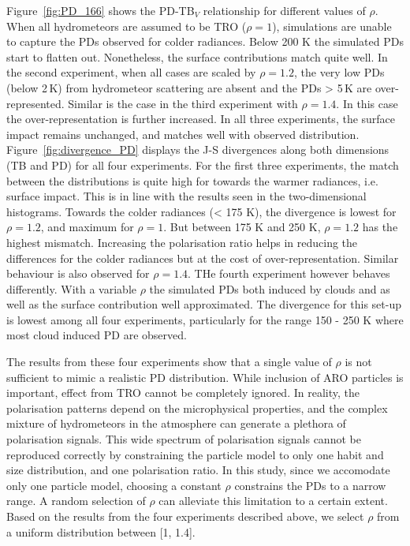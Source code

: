 \documentclass[amt, manuscript]{copernicus}
\begin{document}
Figure~\ref{fig:PD_166} shows the PD-TB$_V$ relationship for different values of $\rho$. When all hydrometeors are assumed to be TRO ($\rho = 1$), simulations are unable to capture the PDs observed for colder radiances. Below 200\,\,K the simulated PDs start to flatten out. Nonetheless, the surface contributions match quite well. In the second experiment, when all cases are scaled by $\rho = 1.2$, the very low PDs (below 2\,K) from hydrometeor scattering are absent and the PDs > 5\,K are over-represented. Similar is the case in the third experiment with $\rho = 1.4$. In this case the over-representation is further increased. In all three experiments, the surface impact remains unchanged, and matches well with observed distribution. Figure~\ref{fig:divergence_PD} displays the J-S divergences along both dimensions (TB and PD) for all four experiments. For the first three experiments, the match between the distributions is quite high for towards the warmer radiances, i.e. surface impact. This is in line with the results seen in the two-dimensional histograms. Towards the colder radiances (< 175\,\,K), the divergence is lowest for $\rho = 1.2$, and maximum for $\rho = 1$. But between 175\,\,K and 250\,\,K, $\rho = 1.2$ has the highest mismatch. Increasing the polarisation ratio helps in reducing the differences for the colder radiances but at the cost of over-representation. Similar behaviour is also observed for $\rho = 1.4$.
THe fourth experiment however behaves differently. With a variable $\rho$ the simulated PDs both induced by clouds and as well as the surface contribution well approximated. The divergence for this set-up is lowest among all four experiments, particularly for the range 150 - 250\,\,K where most cloud induced PD are observed. 

The results from these four experiments show that a single value of $\rho$ is not sufficient to mimic a realistic PD distribution. While inclusion of ARO particles is important, effect from TRO cannot be completely ignored. In reality, the polarisation patterns depend on the microphysical properties, and the complex mixture of hydrometeors in the atmosphere can generate a plethora of polarisation signals. This wide spectrum of polarisation signals cannot be reproduced correctly by constraining the particle model to only one habit and size distribution, and one polarisation ratio. In this study, since we accomodate only one particle model, choosing a constant $\rho$ constrains the PDs to a narrow range. A random selection of $\rho$ can alleviate this limitation to a certain extent. Based on the results from the four experiments described above, we select $\rho$ from a uniform distribution between [1, 1.4].
\end{document}
